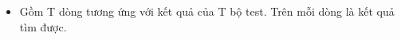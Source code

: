 \begin{itemize}
	\item     Gồm T dòng tương ứng với kết quả của T bộ test. Trên mỗi dòng là kết quả tìm được.   
\end{itemize}